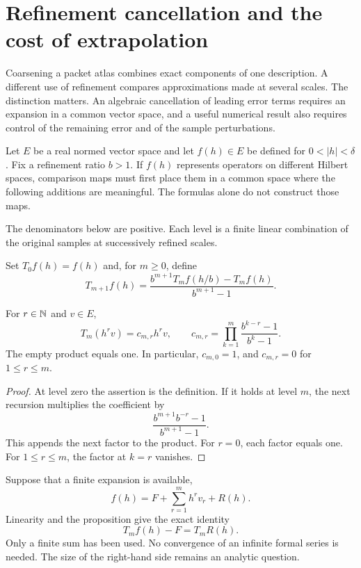 \section{Refinement cancellation and the cost of extrapolation}
\label{f:extrapolation}
Coarsening a packet atlas combines exact components of one description. A different use of refinement compares approximations made at several scales. The distinction matters. An algebraic cancellation of leading error terms requires an expansion in a common vector space, and a useful numerical result also requires control of the remaining error and of the sample perturbations.

Let $E$ be a real normed vector space and let $f(h)\in E$ be defined for $0<|h|<\delta$. Fix a refinement ratio $b>1$. If $f(h)$ represents operators on different Hilbert spaces, comparison maps must first place them in a common space where the following additions are meaningful. The formulas alone do not construct those maps.

The denominators below are positive. Each level is a finite linear combination of the original samples at successively refined scales.

\begin{definition}
Set $T_0f(h)=f(h)$ and, for $m\geq0$, define
\[
 T_{m+1}f(h)=\frac{b^{m+1}T_mf(h/b)-T_mf(h)}{b^{m+1}-1}.
\]
\end{definition}

\begin{proposition}
For $r\in\mathbb N$ and $v\in E$,
\[
 T_m(h^rv)=c_{m,r}h^rv,\qquad
 c_{m,r}=\prod_{k=1}^{m}\frac{b^{k-r}-1}{b^k-1}.
\]
The empty product equals one. In particular, $c_{m,0}=1$, and $c_{m,r}=0$ for $1\leq r\leq m$.
\end{proposition}
\begin{proof}
At level zero the assertion is the definition. If it holds at level $m$, the next recursion multiplies the coefficient by
\[
 \frac{b^{m+1}b^{-r}-1}{b^{m+1}-1}.
\]
This appends the next factor to the product. For $r=0$, each factor equals one. For $1\leq r\leq m$, the factor at $k=r$ vanishes.
\end{proof}

Suppose that a finite expansion is available,
\[
 f(h)=F+\sum_{r=1}^{m}h^rv_r+R(h).
\]
Linearity and the proposition give the exact identity
\[
 T_mf(h)-F=T_mR(h).
\]
Only a finite sum has been used. No convergence of an infinite formal series is needed. The size of the right-hand side remains an analytic question.

